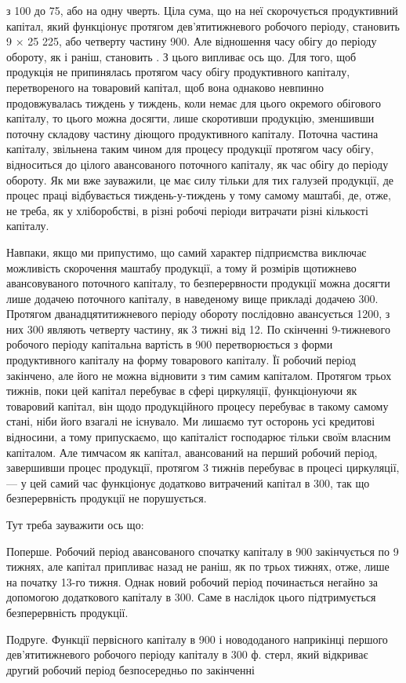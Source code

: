 \parcont{}  %
з 100 до 75, або на одну чверть. Ціла сума, що на неї скорочується
продуктивний капітал, який функціонує протягом дев’ятитижневого робочого
періоду, становить 9 × 25 \deq{} 225, або четверту частину
900. Але відношення часу обігу до періоду обороту, як і раніш,
становить  \deq{} . З цього випливає ось що. Для того, щоб продукція
не припинялась протягом часу обігу продуктивного капіталу, перетвореного
на товаровий капітал, щоб вона однаково невпинно продовжувалась тиждень
у тиждень, коли немає для цього окремого обігового капіталу, то
цього можна досягти, лише скоротивши продукцію, зменшивши поточну
складову частину діющого продуктивного капіталу. Поточна частина капіталу,
звільнена таким чином для процесу продукції протягом часу обігу,
відноситься до цілого авансованого поточного капіталу, як час обігу до
періоду обороту. Як ми вже зауважили, це має силу тільки для тих галузей
продукції, де процес праці відбувається тиждень-у-тиждень у
тому самому маштабі, де, отже, не треба, як у хліборобстві, в різні робочі
періоди витрачати різні кількості капіталу.

Навпаки, якщо ми припустимо, що самий характер підприємства виключає
можливість скорочення маштабу продукції, а тому й розмірів щотижнево
авансовуваного поточного капіталу, то безперервности продукції
можна досягти лише додачею поточного капіталу, в наведеному вище
прикладі додачею 300. Протягом дванадцятитижневого періоду
обороту послідовно авансується 1200, з них 300 являють четверту
частину, як 3 тижні від 12. По скінченні 9-тижневого робочого
періоду капітальна вартість в 900 перетворюється з форми
продуктивного капіталу на форму товарового капіталу. Її робочий період
закінчено, але його не можна відновити з тим самим капіталом. Протягом
трьох тижнів, поки цей капітал перебуває в сфері циркуляції, функціонуючи
як товаровий капітал, він щодо продукційного процесу перебуває
в такому самому стані, ніби його взагалі не існувало. Ми лишаємо тут
осторонь усі кредитові відносини, а тому припускаємо, що капіталіст
господарює тільки своїм власним капіталом. Але тимчасом як капітал,
авансований на перший робочий період, завершивши процес продукції,
протягом 3 тижнів перебуває в процесі циркуляції, — у цей самий час
функціонує додатково витрачений капітал в 300, так що безперервність
продукції не порушується.

Тут треба зауважити ось що:

Поперше. Робочий період авансованого спочатку капіталу в 900 закінчується по 9 тижнях, але капітал припливає назад не раніш,
як по трьох тижнях, отже, лише на початку 13-го тижня. Однак новий
робочий період починається негайно за допомогою додаткового капіталу
в 300. Саме в наслідок цього підтримується безперервність
продукції.

Подруге. Функції первісного капіталу в 900 і новододаного
наприкінці першого дев’ятитижневого робочого періоду капіталу в 300 ф.
стерл, який відкриває другий робочий період безпосередньо по закінченні
\parbreak{}  %
